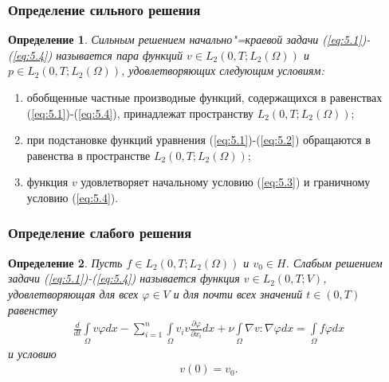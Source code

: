 \documentclass[10pt, pdf, hyperref={unicode}]{beamer}
\newtheorem{ru_def}{Определение}
\renewenvironment{definition}{\begin{ru_def}}{\end{ru_def}}
\begin{document}
  \begin{frame}
    \frametitle{Определение сильного решения}
    \begin{center}
      \begin{minipage}[h]{0.97\linewidth}
        \begin{definition}
          Сильным решением начально"=краевой задачи (\ref{eq:5.1})-(\ref{eq:5.4})
          называется пара функций $v\in L_2(0, T; L_2(\Omega))$ и
          $p\in L_2(0, T; L_2(\Omega))$, удовлетворяющих следующим условиям:
        \end{definition}
        \begin{enumerate} 
          \item обобщенные частные производные функций, содержащихся в равенствах
          (\ref{eq:5.1})-(\ref{eq:5.4}), принадлежат пространству $L_2(0, T; L_2(\Omega))$;
          \item при подстановке функций уравнения (\ref{eq:5.1})-(\ref{eq:5.2})
          обращаются в равенства в пространстве $L_2(0, T; L_2(\Omega))$;
          \item функция $v$ удовлетворяет начальному условию (\ref{eq:5.3}) и граничному условию (\ref{eq:5.4}).
        \end{enumerate}
      \end{minipage}
    \end{center}
  \end{frame}

  \begin{frame}
    \frametitle{Определение слабого решения}
    \begin{center}
      \begin{minipage}[h]{0.97\linewidth}
\begin{definition}
    Пусть $f\in L_2(0,T;L_2(\Omega))$ и $v_0\in H$. Слабым решением задачи (\ref{eq:5.1})-(\ref{eq:5.4}) называется функция $v\in L_2(0, T;V)$,
    удовлетворяющая для всех $\varphi \in V$ и для почти всех значений $t \in (0, T)$ равенству
    \begin{equation}\label{eq:5.6}
        \begin{gathered}
            \frac{d}{dt}\int\limits_\Omega v \varphi dx-\sum_{i=1}^{n}\int\limits_\Omega v_i v
            \frac{\partial \varphi }{\partial x_i}dx + \nu\int\limits_\Omega \nabla v :\nabla\varphi dx=
            \int\limits_\Omega f \varphi dx
        \end{gathered}
    \end{equation}
    и условию
    \begin{equation}\label{eq:5.7}
        \begin{gathered}
            v(0) = v_0.
        \end{gathered}
    \end{equation}
\end{definition}
      \end{minipage}
    \end{center}
  \end{frame}
\end{document}
